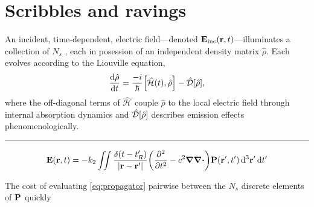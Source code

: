 \section{Scribbles and ravings}

An incident, time-dependent, electric field---denoted $\vb{E}_\text{inc}(\vb{r}, t)$---illuminates a collection of $N_s$ \qds{}, each in posession of an independent density matrix $\hat{\rho}$.
Each \qd{} evolves according to the Liouville equation,
\begin{equation}
  \dv{\hat{\rho}}{t} = \frac{-i}{\hbar} \commutator{\hat{\mathcal{H}}(t)}{\hat{\rho}} - \hat{\mathcal{D}}\qty[\hat{\rho}], 
\end{equation}
where the off-diagonal terms of $\hat{\mathcal{H}}$ couple $\hat{\rho}$ to the local electric field through internal absorption dynamics and $\hat{\mathcal{D}}\qty[\hat{\rho}]$ describes emission effects phenomenologically.

\noindent\rule{\textwidth}{1pt}

\begin{equation}
  \vb{E}(\vb{r}, t) = -k_2 \iint \frac{\delta\qty(t - t'_R)}{\abs{\vb{r} - \vb{r}'}} \qty( \pdv[2]{t} - c^2 \grad \div{} ) \vb{P}(\vb{r}', t') \dd[3]{\vb{r}'} \dd{t'}
  \label{eq:propagator}
\end{equation}

The cost of evaluating \cref{eq:propagator} pairwise between the $N_s$ discrete elements of $\vb{P}$ quickly 
